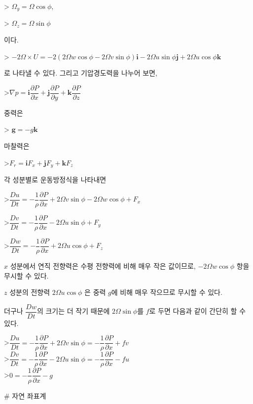 > $ \Omega_{y} = \Omega \cos \phi$, 

> $ \Omega_{z} = \Omega \sin \phi$ 

이다.

> $ -2 \Omega \times U  
= -2 \left( 2 \Omega w \cos \phi -2 \Omega v \sin \phi \right) \mathbf{i}
- 2 \Omega u \sin \phi \mathbf{j}
+ 2 \Omega u \cos \phi \mathbf{k}$

로 나타낼 수 있다. 그리고 기압경도력을 나누어 보면, 

>$ \nabla p = \mathbf{i} \dfrac{\partial P}{\partial x} 
+ \mathbf{j} \dfrac{\partial P}{\partial y}
+ \mathbf{k} \dfrac{\partial P}{\partial z}$

중력은 

> $ \mathbf{g} = -g \mathbf{k} $

마찰력은

>$ F_{r} = \mathbf{i} F_{x}
+ \mathbf{j} F_{y}
+ \mathbf{k} F_{z}$

각 성분별로 운동방정식을 나타내면 

>$ \dfrac{Du}{Dt}
= - \dfrac{1}{\rho} \dfrac{\partial P}{\partial x} 
+ 2 \Omega v \sin \phi - 2 \Omega w \cos \phi 
+ F_{x} $

>$ \dfrac{Dv}{Dt}
= - \dfrac{1}{\rho} \dfrac{\partial P}{\partial x} 
- 2 \Omega u \sin \phi
+ F_{y} $

>$ \dfrac{Dw}{Dt}
= - \dfrac{1}{\rho} \dfrac{\partial P}{\partial x} 
+ 2 \Omega u \cos \phi 
+ F_{z}$

$x$ 성분에서 연직 전향력은 수평 전향력에 비해 매우 작은 값이므로, $- 2 \Omega w \cos \phi $ 항을 무시할 수 있다. 

$z$ 성분의 전향력 $ 2 \Omega u \cos \phi $ 은 중력 $g$에 비해 매우 작으므로 무시할 수 있다. 

더구나 $ \dfrac{Dw}{Dt}$의 크기는 더 작기 때문에 $ 2 \Omega \sin \phi $를 $f$로 두면 다음과 같이 간단히 할 수 있다.

>$ \dfrac{Du}{Dt}
= - \dfrac{1}{\rho} \dfrac{\partial P}{\partial x} 
+ 2 \Omega v \sin \phi 
= - \dfrac{1}{\rho} \dfrac{\partial P}{\partial x} 
+ f v $\\

>$ \dfrac{Dv}{Dt}
= - \dfrac{1}{\rho} \dfrac{\partial P}{\partial x} 
- 2 \Omega u \sin \phi
= - \dfrac{1}{\rho} \dfrac{\partial P}{\partial x}
- f u $\\

>$ 0
= - \dfrac{1}{\rho} \dfrac{\partial P}{\partial x} 
- g $



# 자연 좌표계

